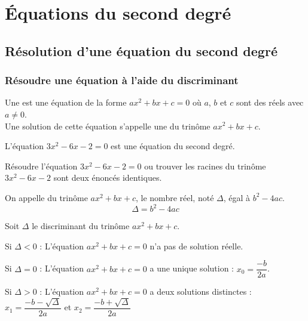 \chapter{Équations du second degré}
\thispagestyle{fancy}

\section{Résolution d'une équation du second degré}

\subsection{Résoudre une équation à l'aide du discriminant}

    \begin{bdefi}
        Une  est une équation de la forme $ax^2+bx+c=0$ où $a$, $b$ et $c$ sont des réels avec $a\neq 0$.\\
        Une solution de cette équation s'appelle une  du trinôme $ax^2+bx+c$.
    \end{bdefi}
    
    \begin{bexemple}
        L'équation $3x^2-6x-2=0$ est une équation du second degré.
    \end{bexemple}
    
    \begin{brmq}
        Résoudre l'équation $3x^2-6x-2=0$ ou trouver les racines du trinôme $3x^2-6x-2$ sont deux énoncés identiques.
    \end{brmq}
        
    \begin{bdefi}
        On appelle  du trinôme $ax^2+bx+c$, le nombre réel, noté $\Delta$, égal à $b^2-4ac$.
        $$\Delta = b^2-4ac$$
    \end{bdefi}
        
    \begin{bprop}
        Soit $\Delta$ le discriminant du trinôme $ax^2+bx+c$.\\
        \begin{itemProp}
            \item Si $\Delta < 0$ : L'équation $ax^2+bx+c=0$ n'a pas de solution réelle.
            \item Si $\Delta = 0$ : L'équation $ax^2+bx+c=0$ a une unique solution : $x_0= \dfrac{-b}{2a}$.
            \item Si $\Delta > 0$ : L'équation $ax^2+bx+c=0$ a deux solutions distinctes :\\
            \hspace*{3cm} $x_1= \dfrac{-b-\sqrt{\Delta}}{2a}$ \hspace*{0.5cm} et \hspace*{0.5cm} $x_2= \dfrac{-b+\sqrt{\Delta}}{2a}$
        \end{itemProp}         
    \end{bprop}
        
